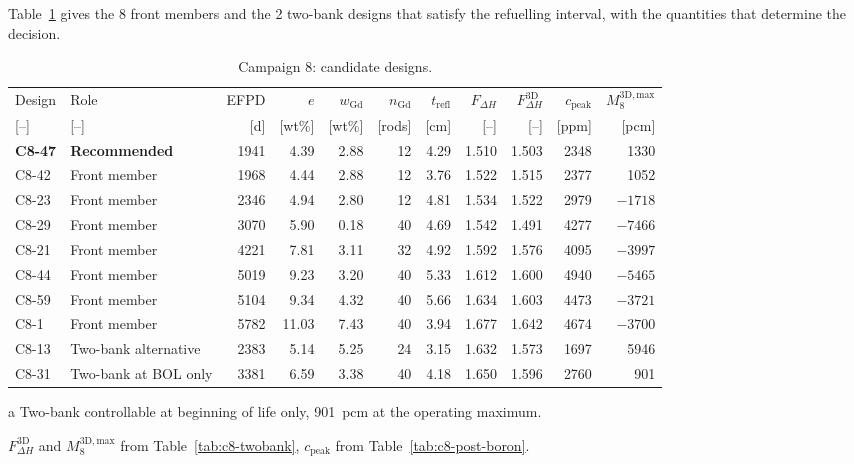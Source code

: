Table~\ref{tab:c8-candidates} gives the 8 front members and the
2 two-bank designs that satisfy the refuelling interval, with the quantities that determine the decision.

\begin{table}[!htb]
  \centering
  \footnotesize
  \begin{threeparttable}
  \caption{Campaign 8: candidate designs.}
  \label{tab:c8-candidates}
  \setlength{\tabcolsep}{2.6pt}\scriptsize
  \begin{tabular}{@{}llrrrrrrrrr@{}}
    \toprule
    Design & Role & EFPD & $e$ & $w_\mathrm{Gd}$ & $n_\mathrm{Gd}$ &
      $t_\mathrm{refl}$ & $F_{\Delta H}$ & $F_{\Delta H}^\mathrm{3D}$ &
      $c_\mathrm{peak}$ & $M_8^\mathrm{3D,max}$ \\
    {[--]} & {[--]} & [d] & [wt\%] & [wt\%] & [rods] & [cm] & [--] & [--] &
      [ppm] & [pcm] \\
    \midrule
    \textbf{C8-47} & \textbf{Recommended} & 1941 & 4.39 & 2.88 & 12 & 4.29 & 1.510 & 1.503 & 2348 & 1330 \\
    C8-42 & Front member & 1968 & 4.44 & 2.88 & 12 & 3.76 & 1.522 & 1.515 & 2377 & 1052 \\
    C8-23 & Front member & 2346 & 4.94 & 2.80 & 12 & 4.81 & 1.534 & 1.522 & 2979 & $-1718$ \\
    C8-29 & Front member & 3070 & 5.90 & 0.18 & 40 & 4.69 & 1.542 & 1.491 & 4277 & $-7466$ \\
    C8-21 & Front member & 4221 & 7.81 & 3.11 & 32 & 4.92 & 1.592 & 1.576 & 4095 & $-3997$ \\
    C8-44 & Front member & 5019 & 9.23 & 3.20 & 40 & 5.33 & 1.612 & 1.600 & 4940 & $-5465$ \\
    C8-59 & Front member & 5104 & 9.34 & 4.32 & 40 & 5.66 & 1.634 & 1.603 & 4473 & $-3721$ \\
    C8-1 & Front member & 5782 & 11.03 & 7.43 & 40 & 3.94 & 1.677 & 1.642 & 4674 & $-3700$ \\
    C8-13 & Two-bank alternative & 2383 & 5.14 & 5.25 & 24 & 3.15 & 1.632 & 1.573 & 1697 & 5946 \\
    C8-31 & Two-bank at BOL only\tnote{a} & 3381 & 6.59 & 3.38 & 40 & 4.18 & 1.650 & 1.596 & 2760 & 901 \\
    \bottomrule
  \end{tabular}
  \begin{tablenotes}[flushleft]\footnotesize
        \item[a] Two-bank controllable at beginning of life only,
      \SI{901}{pcm} at the operating maximum.
    \item $F_{\Delta H}^\mathrm{3D}$ and $M_8^\mathrm{3D,max}$ from
      Table~\ref{tab:c8-twobank}, $c_\mathrm{peak}$ from
      Table~\ref{tab:c8-post-boron}.
  \end{tablenotes}
  \end{threeparttable}
\end{table}

